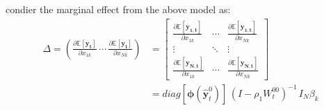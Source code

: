 \documentclass[11pt,final]{article}%
\newcommand{\vect}[1]{\bm{#1}} %
\begin{document}
\cite{Elhorst2017} condier the marginal effect from the above model as:
\begin{align}
\Delta = \left( \frac{\partial \mathbb{E}[\vect{y_t}]  }{\partial x_{1k}} \, \cdots \, \frac{\partial \mathbb{E}[\vect{y_t}]  }{\partial x_{Nk}} \right) &= 
    \begin{bmatrix}
    \frac{\partial \mathbb{E}[\vect{y_{1,t}}]  }{\partial x_{1k}}	&	\cdots 	&	\frac{\partial \mathbb{E}[\vect{y_{1,t}}]  }{\partial x_{Nk}}	\\
    \vdots 	&	\ddots 	& \vdots  \\
    \frac{\partial \mathbb{E}[\vect{y_{N,t}}]  }{\partial x_{1k}}	&	\cdots 	&	\frac{\partial \mathbb{E}[\vect{y_{N,t}}]  }{\partial x_{Nk}}	
    \end{bmatrix} \\
&= diag[ \vect{\phi}	(\hat{\vect{y}}^{0}_{t}) ] \, (I - \rho_{1} W_{t}^{00})^{-1} \, I_{N} \beta_{k} 
\end{align}
\end{document}
